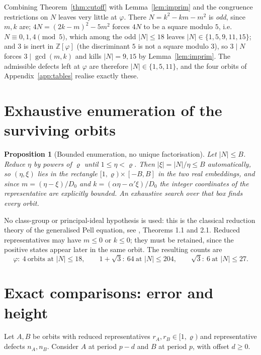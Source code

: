 \documentclass[11pt]{article}
\newtheorem{proposition}[theorem]{Proposition}
\theoremstyle{definition}
\theoremstyle{remark}
\newcommand{\Z}{\mathbb{Z}}
\newcommand{\pr}{\varrho}
\begin{document}
Combining Theorem~\ref{thm:cutoff} with Lemma~\ref{lem:imprim} and the congruence restrictions
on $N$ leaves very little at $\varphi$. There $N=k^2-km-m^2$ is \emph{odd}, since $m,k$ are;
$4N=(2k-m)^2-5m^2$ forces $4N$ to be a square modulo $5$, i.e.\ $N\equiv0,1,4\pmod5$, which
among the odd $|N|\le18$ leaves $|N|\in\{1,5,9,11,15\}$; and $3$ is inert in $\Z[\varphi]$
(the discriminant $5$ is not a square modulo $3$), so $3\mid N$ forces $3\mid\gcd(m,k)$ and
kills $|N|=9,15$ by Lemma~\ref{lem:imprim}. The admissible defects left at $\varphi$ are
therefore $|N|\in\{1,5,11\}$, and the four orbits of Appendix~\ref{app:tables} realise exactly
these.

\section{Exhaustive enumeration of the surviving orbits}\label{sec:enum}

\begin{proposition}[Bounded enumeration, no unique factorisation]\label{prop:enum}
Let $|N|\le B$. Reduce $\eta$ by powers of $\pr$ until $1\le\eta<\pr$. Then
$|\xi|=|N|/\eta\le B$ automatically, so $(\eta,\xi)$ lies in the rectangle
$[1,\pr)\times[-B,B]$ in the two real embeddings, and since $m=(\eta-\xi)/D_0$ and
$k=(\alpha\eta-\alpha'\xi)/D_0$ the integer coordinates of the representative are explicitly
bounded. An exhaustive search over that box finds every orbit.
\end{proposition}

No class-group or principal-ideal hypothesis is used: this is the classical reduction theory of
the generalised Pell equation, see \cite{Conrad}, Theorems 1.1 and 2.1. Reduced representatives may
have $m\le0$ or $k\le0$; they must be retained, since the positive states appear later in the
same orbit. The resulting counts are
\[
\varphi:\ 4\ \text{orbits at }|N|\le18,\qquad
1+\sqrt3:\ 64\ \text{at }|N|\le204,\qquad
\sqrt3:\ 6\ \text{at }|N|\le27 .
\]

\section{Exact comparisons: error and height}\label{sec:compare}

Let $A,B$ be orbits with reduced representatives $r_A,r_B\in[1,\pr)$ and representative defects
$n_A,n_B$. Consider $A$ at period $p-d$ and $B$ at period $p$, with offset $d\ge0$.
\end{document}
